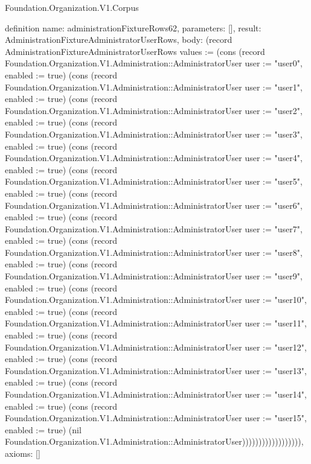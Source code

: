 \begin{lexlean}{Foundation.Organization.V1.Corpus}
\begin{semanticmodule}
definition{
  name: administrationFixtureRows62,
  parameters: [],
  result: AdministrationFixtureAdministratorUserRows,
  body: (record AdministrationFixtureAdministratorUserRows {values := (cons (record Foundation.Organization.V1.Administration::AdministratorUser {user := "user0", enabled := true}) (cons (record Foundation.Organization.V1.Administration::AdministratorUser {user := "user1", enabled := true}) (cons (record Foundation.Organization.V1.Administration::AdministratorUser {user := "user2", enabled := true}) (cons (record Foundation.Organization.V1.Administration::AdministratorUser {user := "user3", enabled := true}) (cons (record Foundation.Organization.V1.Administration::AdministratorUser {user := "user4", enabled := true}) (cons (record Foundation.Organization.V1.Administration::AdministratorUser {user := "user5", enabled := true}) (cons (record Foundation.Organization.V1.Administration::AdministratorUser {user := "user6", enabled := true}) (cons (record Foundation.Organization.V1.Administration::AdministratorUser {user := "user7", enabled := true}) (cons (record Foundation.Organization.V1.Administration::AdministratorUser {user := "user8", enabled := true}) (cons (record Foundation.Organization.V1.Administration::AdministratorUser {user := "user9", enabled := true}) (cons (record Foundation.Organization.V1.Administration::AdministratorUser {user := "user10", enabled := true}) (cons (record Foundation.Organization.V1.Administration::AdministratorUser {user := "user11", enabled := true}) (cons (record Foundation.Organization.V1.Administration::AdministratorUser {user := "user12", enabled := true}) (cons (record Foundation.Organization.V1.Administration::AdministratorUser {user := "user13", enabled := true}) (cons (record Foundation.Organization.V1.Administration::AdministratorUser {user := "user14", enabled := true}) (cons (record Foundation.Organization.V1.Administration::AdministratorUser {user := "user15", enabled := true}) (nil Foundation.Organization.V1.Administration::AdministratorUser)))))))))))))))))}),
  axioms: []
}


\end{semanticmodule}
\end{lexlean}
